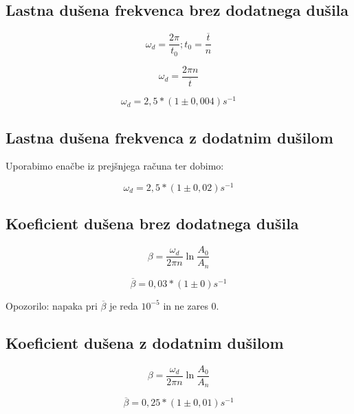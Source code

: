 \subsection{Lastna dušena frekvenca brez dodatnega dušila}

\centering \Large
\begin{equation}
    \omega_d = \frac{2\pi}{t_0}; t_0 = \frac{\overline{t}}{n}
\end{equation}
\raggedright \normalsize
\centering \Large
\begin{equation}
    \omega_d = \frac{2\pi n}{\overline{t}}
\end{equation}
\raggedright \normalsize
\centering \Large
\begin{equation}
    \omega_d = 2,5 * (1\pm 0,004) s^{-1}
\end{equation}
\raggedright \normalsize

\subsection{Lastna dušena frekvenca z dodatnim dušilom}

Uporabimo enačbe iz prejšnjega računa ter dobimo:

\centering \Large
\begin{equation}
    \omega_d = 2,5 * (1\pm 0,02) s^{-1}
\end{equation}
\raggedright \normalsize

\subsection{Koeficient dušena brez dodatnega dušila}

\centering \Large
\begin{equation}
    \beta = \frac{\omega_d}{2\pi n}\ln{\frac{A_0}{A_n}}
\end{equation}
\raggedright \normalsize
\centering \Large
\begin{equation}
    \overline{\beta} = 0,03 * (1\pm0) s^{-1}
\end{equation}
\raggedright \normalsize

Opozorilo: napaka pri $\overline{\beta}$ je reda $10^{-5}$ in ne zares $0$.

\subsection{Koeficient dušena z dodatnim dušilom}

\centering \Large
\begin{equation}
    \beta = \frac{\omega_d}{2\pi n}\ln{\frac{A_0}{A_n}}
\end{equation}
\raggedright \normalsize
\centering \Large
\begin{equation}
    \overline{\beta} = 0,25 * (1\pm0,01) s^{-1}
\end{equation}
\raggedright \normalsize

